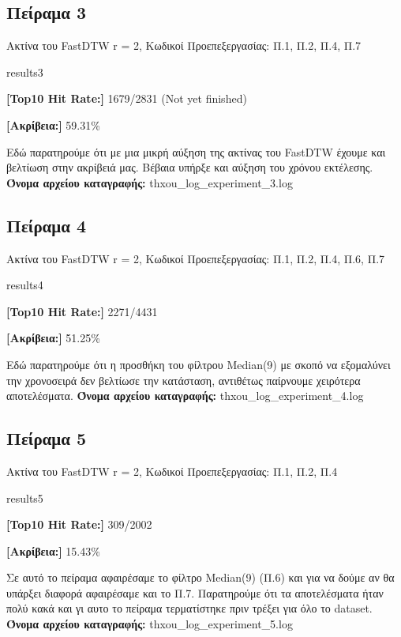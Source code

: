 \subsection{Πείραμα 3}
Ακτίνα του FastDTW r = 2, Κωδικοί Προεπεξεργασίας: Π.1, Π.2, Π.4, Π.7
\begin{labeling}{results3}
  \item \textbf{[Top10 Hit Rate:]} 1679/2831 (Not yet finished)
  \item \textbf{[Ακρίβεια:]} 59.31\%
\end{labeling}
Εδώ παρατηρούμε ότι με μια μικρή αύξηση της ακτίνας του FastDTW έχουμε και βελτίωση στην ακρίβειά μας.
Βέβαια υπήρξε και αύξηση του χρόνου εκτέλεσης.
\textbf{Όνομα αρχείου καταγραφής:} thxou\_log\_experiment\_3.log

\subsection{Πείραμα 4}
Ακτίνα του FastDTW r = 2, Κωδικοί Προεπεξεργασίας: Π.1, Π.2, Π.4, Π.6, Π.7
\begin{labeling}{results4}
  \item \textbf{[Top10 Hit Rate:]} 2271/4431
  \item \textbf{[Ακρίβεια:]} 51.25\%
\end{labeling}
Εδώ παρατηρούμε ότι η προσθήκη του φίλτρου Median(9) με σκοπό να εξομαλύνει την χρονοσειρά δεν βελτίωσε την κατάσταση, αντιθέτως παίρνουμε χειρότερα αποτελέσματα.
\textbf{Όνομα αρχείου καταγραφής:} thxou\_log\_experiment\_4.log

\subsection{Πείραμα 5}
Ακτίνα του FastDTW r = 2, Κωδικοί Προεπεξεργασίας: Π.1, Π.2, Π.4
\begin{labeling}{results5}
  \item \textbf{[Top10 Hit Rate:]} 309/2002
  \item \textbf{[Ακρίβεια:]} 15.43\%
\end{labeling}
Σε αυτό το πείραμα αφαιρέσαμε το φίλτρο Median(9) (Π.6) και για να δούμε αν θα υπάρξει διαφορά αφαιρέσαμε και το Π.7. Παρατηρούμε ότι τα αποτελέσματα ήταν πολύ κακά και γι αυτο το πείραμα τερματίστηκε πριν τρέξει για όλο το dataset.
\textbf{Όνομα αρχείου καταγραφής:} thxou\_log\_experiment\_5.log
